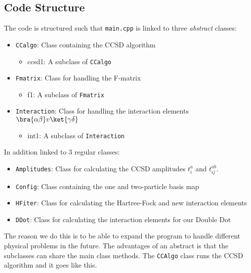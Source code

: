 \subsection{Code Structure}
The code is structured such that \texttt{main.cpp} is linked to three \emph{abstract} classes:
\begin{itemize}
  \item \texttt{CCalgo}: Class containing the CCSD algorithm
  \begin{itemize}
  \item ccsd1: A subclass of \texttt{CCalgo} 
  \end{itemize}
  \item \texttt{Fmatrix}: Class for handling the F-matrix
    \begin{itemize}
  \item f1: A subclass of \texttt{Fmatrix} 
  \end{itemize}
  \item \texttt{Interaction}: Class for handling the interaction elements $\bra{\alpha \beta}v\ket{\gamma \delta}$
      \begin{itemize}
  \item int1: A subclass of \texttt{Interaction} 
  \end{itemize}
\end{itemize}
In addition linked to 3 regular classes:
\begin{itemize}
  \item \texttt{Amplitudes}: Class for calculating the CCSD amplitudes $t_i^a$ and $t_{ij}^{ab}$. 
  \item \texttt{Config}: Class containing the one and two-particle basis map
  \item \texttt{HFiter}: Class for calculating the Hartree-Fock and new interaction elements 
  \item \texttt{DDot}: Class for calculating the interaction elements for our Double Dot
\end{itemize}
%
The reason we do this is to be able to expand the program to handle different physical problems in the future. The advantages of an abstract is that the subclasses can share the main class methods. The \texttt{CCAlgo} class runs the CCSD algorithm and it goes like this.
